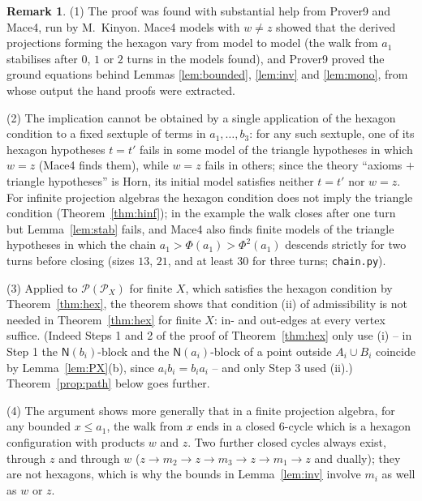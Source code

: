 \documentclass[11pt]{amsart}
\theoremstyle{definition}
\newtheorem{remark}[theorem]{Remark}
\renewcommand{\P}{\mathcal{P}}
\newcommand{\N}{\mathsf{N}}
\begin{document}
\begin{remark}\label{rem:equiv}
(1) The proof was found with substantial help from Prover9 and Mace4, run by M.~Kinyon. Mace4 models with $w\ne z$ showed that the derived projections forming the hexagon vary from model to model (the walk from $a_1$ stabilises after $0$, $1$ or $2$ turns in the models found), and Prover9 proved the ground equations behind Lemmas \ref{lem:bounded}, \ref{lem:inv} and \ref{lem:mono}, from whose output the hand proofs were extracted.

(2) The implication cannot be obtained by a single application of the hexagon condition to a fixed sextuple of terms in $a_1,\dots,b_3$: for any such sextuple, one of its hexagon hypotheses $t=t'$ fails in some model of the triangle hypotheses in which $w=z$ (Mace4 finds them), while $w=z$ fails in others; since the theory ``axioms $+$ triangle hypotheses'' is Horn, its initial model satisfies neither $t=t'$ nor $w=z$. For infinite projection algebras the hexagon condition does not imply the triangle condition (Theorem~\ref{thm:hinf}); in the example the walk closes after one turn but Lemma~\ref{lem:stab} fails, and Mace4 also finds finite models of the triangle hypotheses in which the chain $a_1>\Phi(a_1)>\Phi^2(a_1)$ descends strictly for two turns before closing (sizes $13$, $21$, and at least $30$ for three turns; \texttt{chain.py}).

(3) Applied to $\P(\P_X)$ for finite $X$, which satisfies the hexagon condition by Theorem~\ref{thm:hex}, the theorem shows that condition (ii) of admissibility is not needed in Theorem~\ref{thm:hex} for finite $X$: in- and out-edges at every vertex suffice. (Indeed Steps 1 and 2 of the proof of Theorem~\ref{thm:hex} only use (i) -- in Step 1 the $\N(b_i)$-block and the $\N(a_i)$-block of a point outside $A_i\cup B_i$ coincide by Lemma~\ref{lem:PX}(b), since $a_ib_i=b_ia_i$ -- and only Step 3 used (ii).) Theorem~\ref{prop:path} below goes further.

(4) The argument shows more generally that in a finite projection algebra, for any bounded $x\le a_1$, the walk from $x$ ends in a closed $6$-cycle which is a hexagon configuration with products $w$ and $z$. Two further closed cycles always exist, through $z$ and through $w$ ($z\to m_2\to z\to m_3\to z\to m_1\to z$ and dually); they are not hexagons, which is why the bounds in Lemma~\ref{lem:inv} involve $m_i$ as well as $w$ or $z$.
\end{remark}
\end{document}
